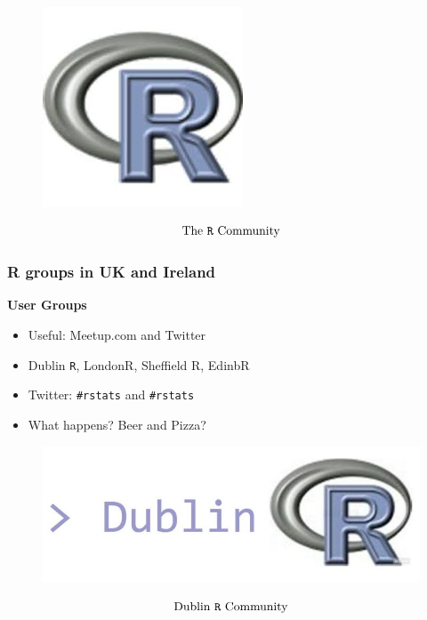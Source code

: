 \documentclass{beamer}
\begin{document}
		\begin{frame}
			\begin{figure}
				\centering
				\includegraphics[width=0.6\linewidth]{rlogo}
			\end{figure}
			\LARGE
			\[ \mbox{The \texttt{R} Community} \] \bigskip
			
		\end{frame}
	\begin{frame}
	
	\frametitle{R groups in UK and Ireland}
		\textbf{User Groups}
		\Large
		\begin{itemize}
			
			\item Useful: Meetup.com and Twitter
			
			\item Dublin \texttt{R}, LondonR, Sheffield R, EdinbR
			
			\item Twitter: \texttt{\#}\texttt{rstats} and \texttt{\#}\texttt{rstats}
			
			\item What happens? Beer and Pizza?
			
		\end{itemize}
		
	\end{frame}
\begin{frame}
\begin{figure}
	\centering
	\includegraphics[width=0.9\linewidth]{dublinrlogo.jpg}
\end{figure}
\LARGE
\[ \mbox{Dublin \texttt{R} Community} \] \bigskip
\end{frame}	
\end{document}
